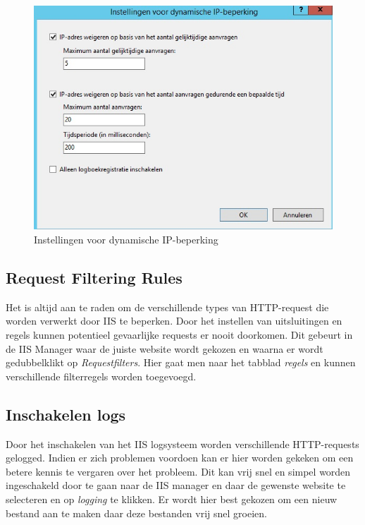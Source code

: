 \documentclass[pdftex,a4paper,12pt]{report}
\begin{document}
\begin{figure}[H]
\begin{center}
\includegraphics[scale=0.60]{img/IIS_Restrictie}
\end{center}
\label{img:IISRestrictie}
\caption{Instellingen voor dynamische IP-beperking}
\end{figure}

\subsection{Request Filtering Rules}
Het is altijd aan te raden om de verschillende types van HTTP-request die worden verwerkt door IIS te beperken. Door het instellen van uitsluitingen en regels kunnen potentieel gevaarlijke requests er nooit doorkomen. Dit gebeurt in de IIS Manager waar de juiste website wordt gekozen en waarna er wordt gedubbelklikt op \textit{Requestfilters}. Hier gaat men naar het tabblad \textit{regels} en kunnen verschillende filterregels worden toegevoegd.\citep{Darmanin2014} \citep{Microsoft2013}

\subsection{Inschakelen logs}
Door het inschakelen van het IIS logsysteem worden verschillende HTTP-requests gelogged. Indien er zich problemen voordoen kan er hier worden gekeken om een betere kennis te vergaren over het probleem. Dit kan vrij snel en simpel worden ingeschakeld door te gaan naar de IIS manager en daar de gewenste website te selecteren en op \textit{logging} te klikken. Er wordt hier best gekozen om een nieuw bestand aan te maken daar deze bestanden vrij snel groeien. \citep{Darmanin2014} \citep{Microsoft2013}
\end{document}
